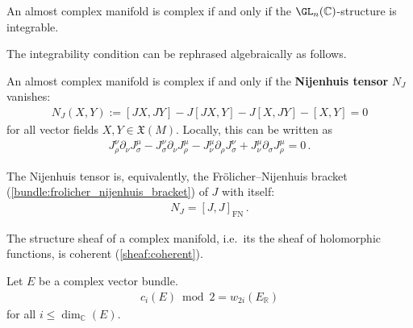     \begin{property}
        An almost complex manifold is complex if and only if the $\GL_n(\mathbb{C})$-structure is integrable.
    \end{property}
    The integrability condition can be rephrased algebraically as follows.
    \begin{theorem}
        An almost complex manifold is complex if and only if the \textbf{Nijenhuis tensor} $N_J$ vanishes:
        \begin{gather}
            \label{complex:integrable_structure}
            N_J(X,Y) := [JX,JY] - J[JX,Y] - J[X,JY] - [X,Y] = 0
        \end{gather}
        for all vector fields $X,Y\in\mathfrak{X}(M)$. Locally, this can be written as
        \begin{gather}
            J_\rho^\nu\partial_\nu J_\sigma^\mu - J_\sigma^\nu\partial_\nu J_\rho^\mu - J_\nu^\mu\partial_\rho J_\sigma^\nu + J_\nu^\mu\partial_\sigma J_\rho^\mu = 0\,.
        \end{gather}
    \end{theorem}
    \begin{property}
        The Nijenhuis tensor is, equivalently, the Fr\"olicher--Nijenhuis bracket (\cref{bundle:frolicher_nijenhuis_bracket}) of $J$ with itself:
        \begin{gather}
            N_J = [J,J]_{\text{FN}}\,.
        \end{gather}
    \end{property}

    \begin{theorem}
        The structure sheaf of a complex manifold, i.e.~its the sheaf of holomorphic functions, is coherent (\cref{sheaf:coherent}).
    \end{theorem}

    \begin{property}\label{complex:stiefel_whitney}
        Let $E$ be a complex vector bundle.
        \begin{gather}
            c_i(E)\bmod2 = w_{2i}(E_{\mathbb{R}})
        \end{gather}
        for all $i\leq\dim_{\mathbb{C}}(E)$.
    \end{property}

